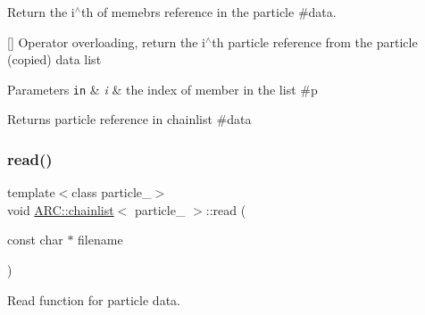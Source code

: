 Return the i$^\wedge$th of memebr\textquotesingle{}s reference in the particle \#data. 

\mbox{[}\mbox{]} Operator overloading, return the i$^\wedge$th particle reference from the particle (copied) data list 
\begin{DoxyParams}[1]{Parameters}
\mbox{\tt in}  & {\em i} & the index of member in the list \#p \\
\hline
\end{DoxyParams}
\begin{DoxyReturn}{Returns}
particle reference in chainlist \#data 
\end{DoxyReturn}
\hypertarget{classARC_1_1chainlist_adfa67e2ccdbdfd7ed945fa7617f90ecc}{}\label{classARC_1_1chainlist_adfa67e2ccdbdfd7ed945fa7617f90ecc} 
\subsubsection{\texorpdfstring{read()}{read()}}
{\footnotesize\ttfamily template$<$class particle\+\_\+$>$ \\
void \hyperlink{classARC_1_1chainlist}{A\+R\+C\+::chainlist}$<$ particle\+\_\+ $>$\+::read (\begin{DoxyParamCaption}\item[{const char $\ast$}]{filename }\end{DoxyParamCaption})\hspace{0.3cm}{\ttfamily [inline]}}



Read function for particle data. 


